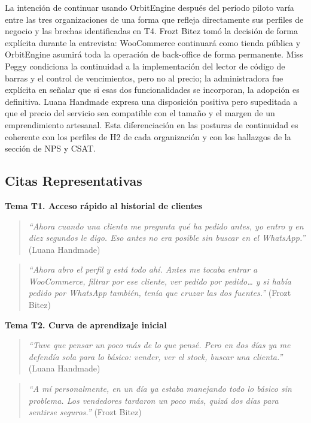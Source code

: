 La intención de continuar usando OrbitEngine después del período piloto varía entre las tres organizaciones de una forma que refleja directamente sus perfiles de negocio y las brechas identificadas en T4. Frozt Bitez tomó la decisión de forma explícita durante la entrevista: WooCommerce continuará como tienda pública y OrbitEngine asumirá toda la operación de back-office de forma permanente. Miss Peggy condiciona la continuidad a la implementación del lector de código de barras y el control de vencimientos, pero no al precio; la administradora fue explícita en señalar que si esas dos funcionalidades se incorporan, la adopción es definitiva. Luana Handmade expresa una disposición positiva pero supeditada a que el precio del servicio sea compatible con el tamaño y el margen de un emprendimiento artesanal. Esta diferenciación en las posturas de continuidad es coherente con los perfiles de H2 de cada organización y con los hallazgos de la sección de NPS y CSAT.

\subsection{Citas Representativas}\label{citas-representativas}

\textbf{Tema T1. Acceso rápido al historial de clientes}

\begin{quote}
\emph{``Ahora cuando una clienta me pregunta qué ha pedido antes, yo entro y en diez segundos le digo. Eso antes no era posible sin buscar en el WhatsApp.''} (Luana Handmade)
\end{quote}

\begin{quote}
\emph{``Ahora abro el perfil y está todo ahí. Antes me tocaba entrar a WooCommerce, filtrar por ese cliente, ver pedido por pedido\ldots{} y si había pedido por WhatsApp también, tenía que cruzar las dos fuentes.''} (Frozt Bitez)
\end{quote}

\textbf{Tema T2. Curva de aprendizaje inicial}

\begin{quote}
\emph{``Tuve que pensar un poco más de lo que pensé. Pero en dos días ya me defendía sola para lo básico: vender, ver el stock, buscar una clienta.''} (Luana Handmade)
\end{quote}

\begin{quote}
\emph{``A mí personalmente, en un día ya estaba manejando todo lo básico sin problema. Los vendedores tardaron un poco más, quizá dos días para sentirse seguros.''} (Frozt Bitez)
\end{quote}

